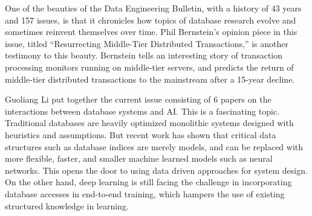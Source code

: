 \documentclass[11pt]{article}
\begin{document}
One of the beauties of the Data Engineering Bulletin, with a history
of 43 years and 157 issues, is that it chronicles how topics of
database research evolve and sometimes reinvent themselves over
time. Phil Bernstein's opinion piece in this issue, titled
``Resurrecting Middle-Tier Distributed Transactions,'' is another
testimony to this beauty. Bernstein tells an interesting story of
transaction processing monitors running on middle-tier servers, and
predicts the return of middle-tier distributed transactions to the
mainstream after a 15-year decline.

Guoliang Li put together the current issue consisting of 6 papers on
the interactions between database systems and AI. This is a
fascinating topic. Traditional databases are heavily optimized
monolithic systems designed with heuristics and assumptions. But
recent work has shown that critical data structures such as database
indices are merely models, and can be replaced with more flexible,
faster, and smaller machine learned models such as neural
networks. This opens the door to using data driven approaches for
system design. On the other hand, deep learning is still facing the
challenge in incorporating database accesses in end-to-end training,
which hampers the use of existing structured knowledge in learning.
\end{document}
